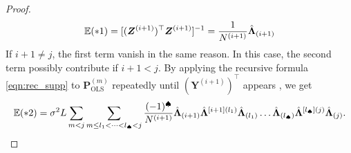 \documentclass{article}
\begin{document}
\begin{proof}
\begin{align}
\mathbb{E} (*1)
=
[(\bm Z^{(i+1)})^\top \bm Z^{(i+1)} ]^{-1}
=
\frac{1}{N^{(i+1)}}
\hat{\bm \Lambda}_{(i+1)}
\label{eqn:43}
\end{align}
If $i+1 \neq j$, the first term vanish in the same reason.
In this case, the second term possibly contribute if $i+1 < j$.
By applying the recursive formula \cref{eqn:rec_supp} to $\bm P_\mathrm{OLS}^{(m)}$ repeatedly until $(\bm Y^{(i+1)})^\top$ appears , we get
\begin{align}
\mathbb{E} (*2)
=
\sigma^2 L
\sum_{m < j}
\sum_{m \leq l_1 < \dots < l_\spadesuit <j }
\frac{(-1)^{\spadesuit}}{N^{(i+1)}}
\hat{\bm \Lambda}_{(i+1)}
\hat{\bm \Lambda}^{[i+1](l_1)}
\hat{\bm \Lambda}_{(l_1)}
\dots
\hat{\bm \Lambda}_{(l_\spadesuit)}
\hat{\bm \Lambda}^{[l_\spadesuit](j)}
\hat{\bm \Lambda}_{(j)}.
\label{eqn:44}
\end{align}


\end{proof}
\end{document}
